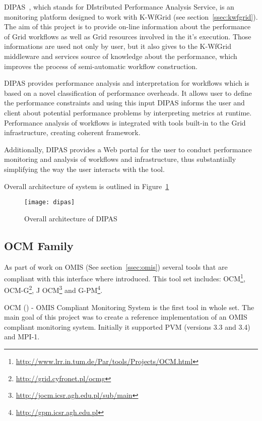 DIPAS~\cite{DIPAS}, which stands for DIstributed Performance Analysis Service, is an monitoring platform
designed to work with K-WfGrid (see section~\ref{ssec:kwfgrid}). The aim of this project is to provide on-line
information about the performance of Grid workflows as well as Grid resources involved in the it\rq{}s execution. Those informations are used not only by user, but it also gives to the K-WfGrid middleware and services
source of knowledge about the performance, which improves the process of semi-automatic workflow
construction.

DIPAS provides performance analysis and interpretation for workflows which is based on a novel classification of
performance overheads. It allows user to define the performance constraints and using this input DIPAS informs the user and client about potential performance problems by interpreting metrics at runtime.
Performance analysis of workflows is integrated with tools built-in to the Grid infrastructure, creating coherent
framework. 

Additionally, DIPAS provides a Web portal for the user to conduct performance monitoring and analysis of workflows and infrastructure, thus substantially simplifying the way the user interacts with the tool.

Overall architecture of system is outlined in Figure~\ref{fig:dipas}

\begin{figure}[ht]
  \centering
  \texttt{[image: dipas]}
  \caption{Overall architecture of DIPAS}
  \label{fig:dipas}
\end{figure}

\subsection{OCM Family}

As part of work on OMIS (See section~\ref{ssec:omis}) several tools that are compliant with this interface where introduced. This tool set
includes: OCM\footnote{\url{http://www.lrr.in.tum.de/Par/tools/Projects/OCM.html}}, OCM-G\footnote{\url{http://grid.cyfronet.pl/ocmg}}, J
OCM\footnote{\url{http://jocm.icsr.agh.edu.pl/sub/main}} and G-PM\footnote{\url{http://gpm.icsr.agh.edu.pl}}.

OCM (\cite{RWspdt98, RW:ppam99b}) - OMIS Compliant Monitoring System is the first tool in whole set. The main goal of this project was to create a reference implementation of an OMIS compliant monitoring system. Initially it supported PVM (versions 3.3 and 3.4) and MPI-1. 

